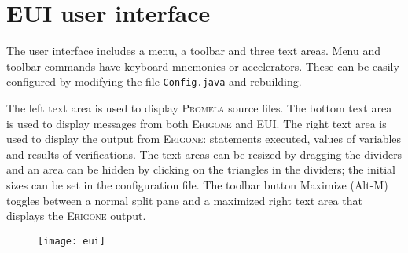 \documentclass[11pt]{article}
\newcommand{\eri}{\textsc{Erigone}}
\newcommand{\prm}{\textsc{Promela}}
\newcommand{\eui}{\textsc{EUI}}
\newcommand{\p}[1]{\texttt{#1}}
\newcommand{\bu}[1]{\textsf{#1}}
\begin{document}
\section{\eui{} user interface}
The user interface includes a menu, a toolbar and three text areas.
Menu and toolbar commands have keyboard mnemonics or accelerators.
These can be easily configured by modifying the file \p{Config.java} and
rebuilding.

The left text area is used to display \prm{} source files. The bottom
text area is used to display messages from both \eri{} and \eui{}. The
right text area is used to display the output from \eri{}: statements
executed, values of variables and results of verifications. The text
areas can be resized by dragging the dividers and an area can be hidden
by clicking on the triangles in the dividers; the initial sizes can be
set in the configuration file. The toolbar button \bu{Maximize}
(\bu{Alt-M}) toggles between a normal split pane and a maximized right
text area that displays the \eri{} output.

\begin{figure}[tb]
\begin{center}
\texttt{[image: eui]}
\end{center}
\end{figure}
\end{document}
